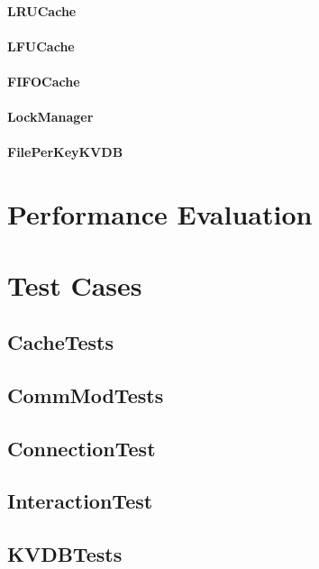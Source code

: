 \documentclass[12pt]{article}
\begin{document}
\begin{multicols}{2}
\paragraph{LRUCache}

\paragraph{LFUCache}

\paragraph{FIFOCache}

\paragraph{LockManager}

\paragraph{FilePerKeyKVDB}


\section{Performance Evaluation}


\section{Test Cases}

\subsection{CacheTests}

\subsection{CommModTests}

\subsection{ConnectionTest}

\subsection{InteractionTest}

\subsection{KVDBTests}


\end{multicols}
\end{document}
